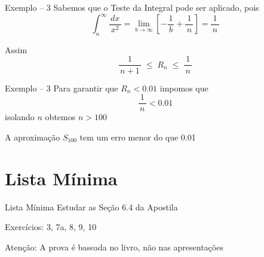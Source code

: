 \begin{frame}{Exemplo -- 3}
  Sabemos que o Teste da Integral pode ser aplicado, pois
  \[
    \int_n^\infty\frac{\,dx\,}{x^2}
    = \lim_{b\to\infty}\left[ -\frac{1}{\,b\,} + \frac{1}{\,n\,} \right]
    = \frac{1}{\,n\,}
  \]

  \pause
  \vspace{\baselineskip}
  Assim
  \[
    \frac{1}{\,n+1\,} \;\leq\; R_n \;\leq\; \frac{1}{\,n\,}
  \]
\end{frame}

\begin{frame}{Exemplo -- 3}
  Para garantir que $R_n<\num{0.01}$ impomos que
  \[
    \frac{1}{\,n\,} < \num{0.01}
  \]
  isolando $n$ obtemos $n>100$

  \pause
  \vspace{\baselineskip}
  A aproximação $S_{100}$ tem um erro menor do que \num{0.01}
\end{frame}

\section{Lista Mínima}

\begin{frame}{Lista Mínima}
  Estudar as Seção 6.4 da Apostila

  \vspace{\baselineskip}
  Exercícios: 3, 7a, 8, 9, 10

  \vfill
  Atenção: A prova é baseada no livro, não nas apresentações
\end{frame}


